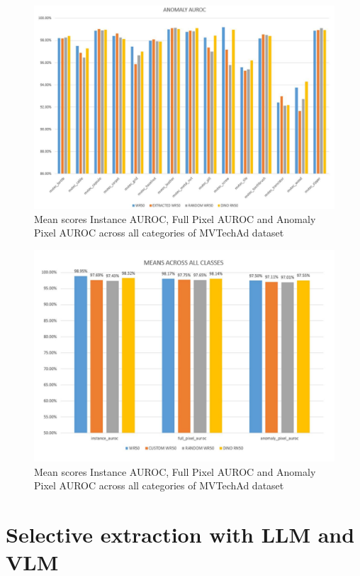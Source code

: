 \begin{figure}[h]
	\begin{center}
		\includegraphics[width=1.0\linewidth]{Chapter_4/wd_anomaly.png}
	\end{center}
	\caption{Mean scores Instance AUROC, Full Pixel AUROC and Anomaly Pixel AUROC across all categories of MVTechAd dataset}
	\label{fig:wd_anomaly}
\end{figure}

\begin{figure}[h]
	\begin{center}
		\includegraphics[width=1.0\linewidth]{Chapter_4/wd_mean.png}
	\end{center}
	\caption{Mean scores Instance AUROC, Full Pixel AUROC and Anomaly Pixel AUROC across all categories of MVTechAd dataset}
	\label{fig:wd_mean}
\end{figure}

\section{Selective extraction with LLM and VLM}
